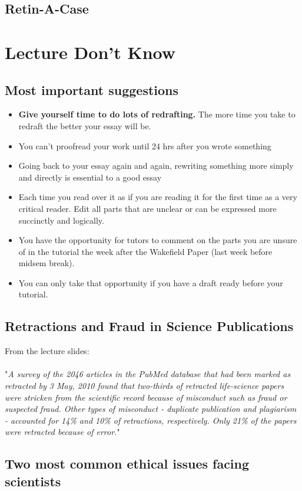 \documentclass{report}
\theoremstyle{definition}
\theoremstyle{plain}
\theoremstyle{remark}
\begin{document}
\subsection{Retin-A-Case}

\section{Lecture Don't Know}
\subsection{Most important suggestions}
\begin{itemize}
  \item \textbf{Give yourself time to do lots of redrafting.} The more time you
    take to redraft the better your essay will be.
  \item You can't proofread your work until 24 hrs after you wrote something
  \item Going back to your essay again and again, rewriting something more
    simply and directly is essential to a good essay
  \item Each time you read over it as if you are reading it for the first time
    as a very critical reader. Edit all parts that are unclear or can be
    expressed more succinctly and logically.
  \item You have the opportunity for tutors to comment on the parts you are
    unsure of in the tutorial the week after the Wakefield Paper (last week
    before midsem break). 
  \item You can only take that opportunity if you have a draft ready before
    your tutorial.
\end{itemize}
\subsection{Retractions and Fraud in Science Publications}
From the lecture slides: \\\\ "\textit{A survey of the 2046 articles in the PubMed database that had been marked as
retracted by 3 May, 2010 found that two-thirds of retracted life-science papers
were stricken from the scientific record because of misconduct such as fraud or
suspected fraud. Other types of misconduct - duplicate publication and
plagiarism - accounted for 14\% and 10\% of retractions, respectively. Only
21\% of the papers were retracted because of error.}"

\subsection{Two most common ethical issues facing scientists}
\end{document}
